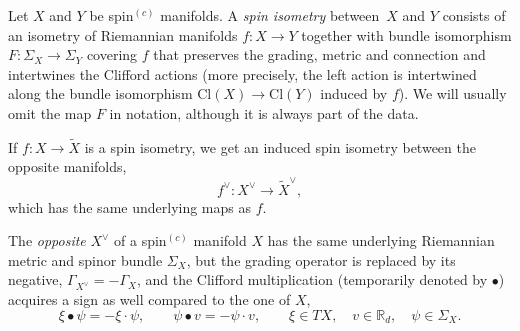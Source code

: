 \documentclass[10pt,a4paper]{amsart}
\numberwithin{equation}{section}
\newcommand{\R}{\mathbb{R}}
\newcommand{\Cl}{\mathrm{Cl}}
\begin{document}
\begin{Definition}
Let $X$ and $Y$ be spin$^{(c)}$ manifolds.
A \emph{spin isometry} between~$X$ and $Y$ consists of an isometry of Riemannian manifolds $f\colon X \to Y$ together with bundle isomorphism $F\colon \Sigma_X \to \Sigma_Y$ covering $f$ that preserves the grading, metric and connection and intertwines the Clifford actions (more precisely, the left action is intertwined along the bundle isomorphism $\Cl(X) \to \Cl(Y)$ induced by $f$).
We will usually omit the map $F$ in notation, although it is always part of the data.
\end{Definition}

If $f\colon X \to \tilde{X}$ is a spin isometry, we get an induced spin isometry between the opposite manifolds,
\[ %
f^\vee\colon X^\vee \to \tilde{X}^\vee,
\]
which has the same underlying maps as $f$.

\begin{Construction}[opposite]
The \emph{opposite} $X^\vee$ of a spin$^{(c)}$ manifold $X$ has the same underlying Riemannian metric and spinor bundle $\Sigma_X$, but the grading operator is replaced by its negative, $\Gamma_{X^\vee} = - \Gamma_X$, and the Clifford multiplication (temporarily denoted by $\bullet$) acquires a sign as well compared to the one of $X$,
\begin{equation*}
 \xi \bullet \psi = - \xi \cdot \psi, \qquad \psi \bullet v = - \psi \cdot v, \qquad \xi \in TX, \quad v \in \R_d,\quad \psi \in \Sigma_X.
\end{equation*}
\end{Construction}
\end{document}
